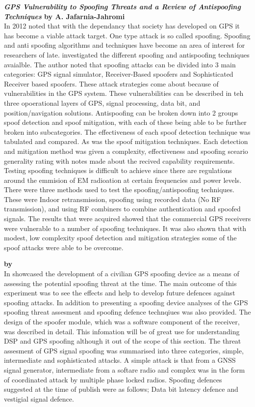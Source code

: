 \textbf{\emph{GPS Vulnerability to Spoofing Threats and a Review of Antispoofing Techniques} by A. Jafarnia-Jahromi} \\
In 2012 \textcite{RN6} noted that with the dependancy that society has developed on GPS it has become a viable attack target. One type attack is
so called spoofing. Spoofing and anti spoofing algorithms and techniques have become an area of interest for researchers of late. \citeauthor{RN6}
investigated the different spoofing and antispoofing techniques avaialble. The author noted that spoofing attacks can be divided into 3 main categories:
GPS signal simulator, Receiver-Based spoofers and Sophisticated Receiver based spoofers. These attack strategies come about because of vulnerabilities in the GPS system.
These vulnerabilities can be described in teh three opoerational layers of GPS, signal processing, data bit, and position/navigation solutions.
Antispoofing can be broken down into 2 groups spoof detection and spoof mitigation, with each of these being able to be further broken into subcategories.
The effectiveness of each spoof detection technique was tabulated and compared. As was the spoof mitigation techniques. Each detection and mitigation
method was given a complexity, effectiveness and spoofing sceario generality rating with notes made about the recived capability requirements.
Testing spoofing techniques is difficult to achieve since there are regulations around the emmision of EM radioation at certain frequencies and power levels.
There were three methods used to test the spoofing/antispoofing techniques. These were Indoor retransmission, spoofing using recorded data (No RF transmission), and
using RF combiners to combine authentication and spoofed signals.
The results that were acquired showed that the commercial GPS receivers were vulnerable to a number of spoofing techniques. It was also
shown that with modest, low complexity spoof detection and mitigation strategies some of the spoof attacks were able to be overcome.

\medskip

\textbf{\emph{} by \citeauthor{RN23}} \\
In \citeyear{RN23} \citeauthor{RN23} \cite{RN23} showcased the development of a civilian GPS spoofing device as a means of assessing the potential spoofing 
threat at the time. The main outcome of this experiment was to see the effects and help to develop future defences against spoofing attacks. In addition to 
presenting a spoofing device analyses of the GPS spoofing threat assesment and spoofing defence technqiues was also provided. 
The design of the spoofer module, which was a software component of the receiver, was described in detail. This infomation will be of great use for understanding 
DSP and GPS spoofing although it out of the scope of this section. 
The threat assesment of GPS signal spoofing was summarised into three categories, simple, intermediate and sophisticated attacks. A simple attack is that from a
GNSS signal generator, intermediate from a softare radio and complex was in the form of coordinated attack by multiple phase locked radios. 
Spoofing defences suggested at the time of publish were as follows; Data bit latency defence and vestigial signal defence.

